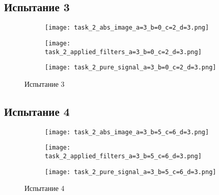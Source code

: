 \newpage
\subsection{Испытание 3}

\begin{figure}[!ht]
	\centering
\hspace*{\fill}%
	\begin{subfigure}[b]{0.30\textwidth}
        \centering
		\texttt{[image: task\_2\_abs\_image\_a=3\_b=0\_c=2\_d=3.png]}
		\caption{}
	
	\end{subfigure}
\hfill
	\begin{subfigure}[b]{0.30\textwidth}
        \centering
		\texttt{[image: task\_2\_applied\_filters\_a=3\_b=0\_c=2\_d=3.png]}
        \caption{}
		
	\end{subfigure}
\hspace*{\fill}%
\par\vspace{\abovecaptionskip}
        \begin{subfigure}[b]{0.30\textwidth}
        \centering
		\texttt{[image: task\_2\_pure\_signal\_a=3\_b=0\_c=2\_d=3.png]}
		\caption{}
	
	\end{subfigure}
	\caption{Испытание 3}
\end{figure}

\newpage
\subsection{Испытание 4}

\begin{figure}[!ht]
	\centering
\hspace*{\fill}%
	\begin{subfigure}[b]{0.30\textwidth}
        \centering
		\texttt{[image: task\_2\_abs\_image\_a=3\_b=5\_c=6\_d=3.png]}
		\caption{}
	
	\end{subfigure}
\hfill
	\begin{subfigure}[b]{0.30\textwidth}
        \centering
		\texttt{[image: task\_2\_applied\_filters\_a=3\_b=5\_c=6\_d=3.png]}
        \caption{}
		
	\end{subfigure}
\hspace*{\fill}%
\par\vspace{\abovecaptionskip}
        \begin{subfigure}[b]{0.30\textwidth}
        \centering
		\texttt{[image: task\_2\_pure\_signal\_a=3\_b=5\_c=6\_d=3.png]}
		\caption{}
	
	\end{subfigure}
	\caption{Испытание 4}
\end{figure}

